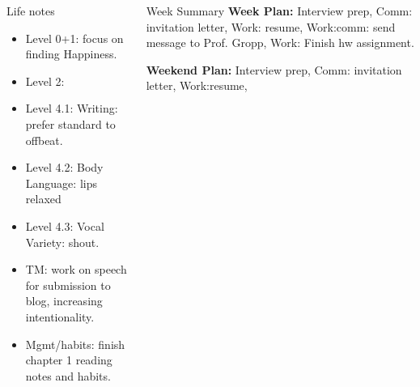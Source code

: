 \documentclass[serif, mathserif, final]{beamer}
\begin{document}
\begin{frame}{}
\begin{columns}
\begin{column}{0.25\linewidth}
  \begin{block}{Life notes} 
    \begin{itemize} 
      \tiny \item \tiny Level 0+1: focus on finding Happiness. 
    \item \tiny Level 2: 
    \item \tiny Level 4.1: Writing: prefer standard to offbeat. 
    \item \tiny Level 4.2: Body Language: lips relaxed
    \item \tiny Level 4.3: Vocal Variety: shout. 
    \item \tiny TM: work on speech for submission to blog, increasing intentionality. 
    \item \tiny Mgmt/habits: finish chapter 1 reading notes and habits. 
    \end{itemize}     
  \end{block}
\end{column} %

\begin{column}{0.50\linewidth}

  \begin{block}{Week Summary}
    \textbf{Week Plan:} Interview prep, Comm: invitation letter, Work:
    resume, Work:comm: send message to Prof. Gropp, Work: Finish hw
    assignment. 

\textbf{Weekend Plan:} Interview prep, Comm: invitation letter, Work:resume, 

  \end{block} 


\end{column}
\end{columns}
\end{frame}
\end{document}
